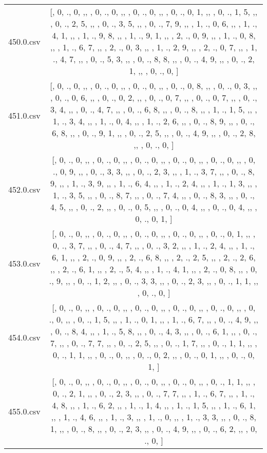 \begin{table}[ht]
\begin{tabular}{@{}c c@{}}
	450.0.csv & [, 0, ., 0, ,,  , 0, ., 0, ,,  , 0, ., 0, ,,  , 0, ., 0, 1, ,,  , 0, ., 1, 5, ,,  , 0, ., 2, 5, ,,  , 0, ., 3, 5, ,,  , 0, ., 7, 9, ,,  , 1, ., 0, 6, ,,  , 1, ., 4, 1, ,,  , 1, ., 9, 8, ,,  , 1, ., 9, 1, ,,  , 2, ., 0, 9, ,,  , 1, ., 0, 8, ,,  , 1, ., 6, 7, ,,  , 2, ., 0, 3, ,,  , 1, ., 2, 9, ,,  , 2, ., 0, 7, ,,  , 1, ., 4, 7, ,,  , 0, ., 5, 3, ,,  , 0, ., 8, 8, ,,  , 0, ., 4, 9, ,,  , 0, ., 2, 1, ,,  , 0, ., 0, ]\\ 
	451.0.csv & [, 0, ., 0, ,,  , 0, ., 0, ,,  , 0, ., 0, ,,  , 0, ., 0, 8, ,,  , 0, ., 0, 3, ,,  , 0, ., 0, 6, ,,  , 0, ., 0, 2, ,,  , 0, ., 0, 7, ,,  , 0, ., 0, 7, ,,  , 0, ., 3, 4, ,,  , 0, ., 4, 7, ,,  , 0, ., 6, 8, ,,  , 0, ., 8, ,,  , 1, ., 1, 5, ,,  , 1, ., 3, 4, ,,  , 1, ., 0, 4, ,,  , 1, ., 2, 6, ,,  , 0, ., 8, 9, ,,  , 0, ., 6, 8, ,,  , 0, ., 9, 1, ,,  , 0, ., 2, 5, ,,  , 0, ., 4, 9, ,,  , 0, ., 2, 8, ,,  , 0, ., 0, ]\\ 
	452.0.csv & [, 0, ., 0, ,,  , 0, ., 0, ,,  , 0, ., 0, ,,  , 0, ., 0, ,,  , 0, ., 0, ,,  , 0, ., 0, 9, ,,  , 0, ., 3, 3, ,,  , 0, ., 2, 3, ,,  , 1, ., 3, 7, ,,  , 0, ., 8, 9, ,,  , 1, ., 3, 9, ,,  , 1, ., 6, 4, ,,  , 1, ., 2, 4, ,,  , 1, ., 1, 3, ,,  , 1, ., 3, 5, ,,  , 0, ., 8, 7, ,,  , 0, ., 7, 4, ,,  , 0, ., 8, 3, ,,  , 0, ., 4, 5, ,,  , 0, ., 2, ,,  , 0, ., 0, 5, ,,  , 0, ., 0, 4, ,,  , 0, ., 0, 4, ,,  , 0, ., 0, 1, ]\\ 
	453.0.csv & [, 0, ., 0, ,,  , 0, ., 0, ,,  , 0, ., 0, ,,  , 0, ., 0, ,,  , 0, ., 0, 1, ,,  , 0, ., 3, 7, ,,  , 0, ., 4, 7, ,,  , 0, ., 3, 2, ,,  , 1, ., 2, 4, ,,  , 1, ., 6, 1, ,,  , 2, ., 0, 9, ,,  , 2, ., 6, 8, ,,  , 2, ., 2, 5, ,,  , 2, ., 2, 6, ,,  , 2, ., 6, 1, ,,  , 2, ., 5, 4, ,,  , 1, ., 4, 1, ,,  , 2, ., 0, 8, ,,  , 0, ., 9, ,,  , 0, ., 1, 2, ,,  , 0, ., 3, 3, ,,  , 0, ., 2, 3, ,,  , 0, ., 1, 1, ,,  , 0, ., 0, ]\\ 
	454.0.csv & [, 0, ., 0, ,,  , 0, ., 0, ,,  , 0, ., 0, ,,  , 0, ., 0, ,,  , 0, ., 0, ,,  , 0, ., 0, ,,  , 0, ., 1, 5, ,,  , 1, ., 0, 1, ,,  , 1, ., 6, 7, ,,  , 0, ., 4, 9, ,,  , 0, ., 8, 4, ,,  , 1, ., 5, 8, ,,  , 0, ., 4, 3, ,,  , 0, ., 6, 1, ,,  , 0, ., 7, ,,  , 0, ., 7, 7, ,,  , 0, ., 2, 5, ,,  , 0, ., 1, 7, ,,  , 0, ., 1, 1, ,,  , 0, ., 1, 1, ,,  , 0, ., 0, ,,  , 0, ., 0, 2, ,,  , 0, ., 0, 1, ,,  , 0, ., 0, 1, ]\\ 
	455.0.csv & [, 0, ., 0, ,,  , 0, ., 0, ,,  , 0, ., 0, ,,  , 0, ., 0, ,,  , 0, ., 1, 1, ,,  , 0, ., 2, 1, ,,  , 0, ., 2, 3, ,,  , 0, ., 7, 7, ,,  , 1, ., 6, 7, ,,  , 1, ., 4, 8, ,,  , 1, ., 6, 2, ,,  , 1, ., 1, 4, ,,  , 1, ., 1, 5, ,,  , 1, ., 6, 1, ,,  , 1, ., 4, 6, ,,  , 1, ., 3, ,,  , 1, ., 0, ,,  , 1, ., 3, 3, ,,  , 0, ., 8, 1, ,,  , 0, ., 8, ,,  , 0, ., 2, 3, ,,  , 0, ., 4, 9, ,,  , 0, ., 6, 2, ,,  , 0, ., 0, ]\\ 

\end{tabular}
\end{table}
